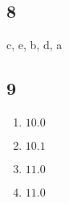 \documentclass{article}
\begin{document}
\begin{multicols}{2}
    \subsection*{8}
    c, e, b, d, a
    \subsection*{9}
    \begin{enumerate}[label= (\alph*)]
        \item \( 10.0 \)
        \item \( 10.1 \)
        \item \( 11.0 \)
        \item \( 11.0 \)
    \end{enumerate}

\end{multicols}
\end{document}
